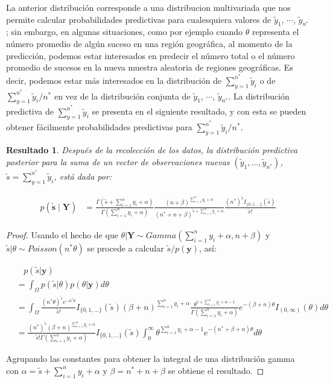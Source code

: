 \documentclass[
  12pt,
  spanish,
]{book}
\newtheorem{proposition}{Resultado}[chapter]
\theoremstyle{definition}
\theoremstyle{definition}
\theoremstyle{definition}
\theoremstyle{definition}
\theoremstyle{remark}
\begin{document}
La anterior distribución corresponde a una distribucion multivariada que nos permite calcular probabilidades predictivas para cualesquiera valores de \(\tilde{y}_1\), \(\cdots\), \(\tilde{y}_{n^*}\); sin embargo, en algunas situaciones, como por ejemplo cuando \(\theta\) representa el número promedio de algún suceso en una región geográfica, al momento de la predicción, podemos estar interesados en predecir el número total o el número promedio de sucesos en la nueva muestra aleatoria de regiones geográficas. Es decir, podemos estar más interesados en la distribución de \(\sum_{y=1}^{n^*} \tilde{y}_i\) o de \(\sum_{y=1}^{n^*} \tilde{y}_i/n^*\) en vez de la distribución conjunta de \(\tilde{y}_1\), \(\cdots\), \(\tilde{y}_{n^*}\). La distribución predictiva de \(\sum_{y=1}^{n^*} \tilde{y}_i\) se presenta en el siguiente resultado, y con esta se pueden obtener fácilmente probabilidades predictivas para \(\sum_{y=1}^{n^*} \tilde{y}_i/n^*\).

\begin{proposition}
\protect\hypertarget{prp:unnamed-chunk-46}{}{\label{prp:unnamed-chunk-46} }Después de la recolección de los datos, la distribución predictiva posterior para la suma de un vector de observaciones nuevas \(\left(\tilde{y}_1,\ldots,\tilde{y}_{n^*}\right)\), \(\tilde{s} = \sum_{y=1}^{n^*} \tilde{y}_i\), está dada por:

\begin{align}
\label{eq:PrePosPoissonSum}
p(\tilde{\mathbf{s}} \mid \mathbf{Y})&=\frac{\Gamma(\tilde{s}+\sum_{i=1}^ny_i+\alpha)}{\Gamma(\sum_{i=1}^ny_i+\alpha)}
\frac{(n+\beta)^{\sum_{i=1}^ny_i+\alpha}}{({n^*}+n+\beta)^{\tilde{s}+\sum_{i=1}^ny_i+\alpha}}\frac{(n^*)^{\tilde{s}}I_{\{0,1,\ldots\}}(\tilde{s})}{\tilde{s}!}
\end{align}
\end{proposition}

\begin{proof}
\iffalse{} {Prueba. } \fi{}Usando el hecho de que \(\theta|\mathbf{Y}\sim Gamma(\sum_{i=1}^{n}y_i+\alpha,n+\beta)\) y \(\tilde{s}|\theta\sim Poisson(n^*\theta)\) se procede a calcular \(\tilde{s}/p(\mathbf{y})\),
así:

\begin{align*}
&\ \ \ \ p(\tilde{s}|\mathbf{y}) \\
&= \int_{\Omega} p(\tilde{s}|\theta)p(\theta|\mathbf{y})d\theta\\
& = \int_{\Omega} \frac{(n^{*}\theta)^{\tilde{s}}e^{-n^*\theta}}{\tilde{s}!} I_{\{0,1,\ldots\}}(\tilde{s}) (\beta+n)^{\sum_{i=1}^{n}y_i+\alpha}\frac{\theta^{\tilde{s}+\sum_{i=1}^{n}y_i+\alpha-1}}{\Gamma(\sum_{i=1}^{n}y_i+\alpha)}e^{-(\beta+n)\theta}I_{(0,\infty)}(\theta) d\theta\\
&= \frac{(n^*)^{\tilde{s}}(\beta+n)^{\sum_{i=1}^{n}y_i+\alpha}}{\tilde{s}!\Gamma(\sum_{i=1}^{n}y_i+\alpha)}I_{\{0,1,\ldots\}}(\tilde{s})\int_{0}^{\infty}\theta^{\sum_{i=1}^{n}y_i+\alpha-1}e^{-(n^*+\beta+n)\theta}d\theta
\end{align*}

Agrupando las constantes para obtener la integral de una distribución gamma con \(\alpha=\tilde{s}+\sum_{i=1}^{n}y_i+\alpha\) y \(\beta=n^*+n+\beta\) se obtiene el resultado.
\end{proof}
\end{document}
